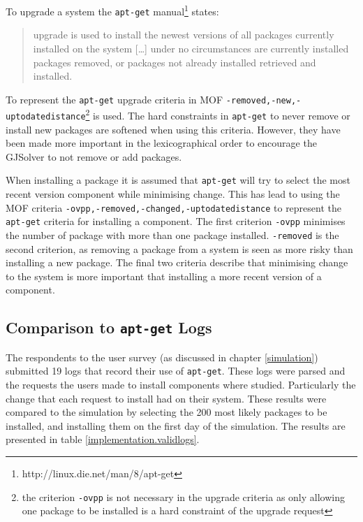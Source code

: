 To upgrade a system the \texttt{apt-get} manual\footnote{http://linux.die.net/man/8/apt-get} states:
\begin{quotation}
upgrade is used to install the newest versions of all packages currently installed on the system 
[\ldots] 
under no circumstances are currently installed packages removed, or packages not already installed retrieved and installed.
\end{quotation}
To represent the \texttt{apt-get} upgrade criteria in MOF 
\texttt{-removed,-new,-uptodatedistance}\footnote{the criterion \texttt{-ovpp} is not necessary in the upgrade criteria 
as only allowing one package to be installed is a hard constraint of the upgrade request} 
is used.
The hard constraints in \texttt{apt-get} to never remove or install new packages are softened when using this criteria.
However, they have been made more important in the lexicographical order to encourage the GJSolver to not remove or add packages.

When installing a package it is assumed that \texttt{apt-get} will try to select the most recent version component while minimising change.
This has lead to using the MOF criteria \texttt{-ovpp,-removed,-changed,-uptodatedistance} to represent the \texttt{apt-get} criteria for installing a component.
The first criterion \texttt{-ovpp} minimises the number of package with more than one package installed.
\texttt{-removed} is the second criterion, as removing a package from a system is seen as more risky than installing a new package.
The final two criteria describe that minimising change to the system is more important that installing a more recent version of a component.

\subsection{Comparison to \texttt{apt-get} Logs}
The respondents to the user survey (as discussed in chapter \ref{simulation}) submitted 19 logs that record their use of \texttt{apt-get}.
These logs were parsed and the requests the users made to install components where studied.
Particularly the change that each request to install had on their system.
These results were compared to the simulation by selecting the 200 most likely packages to be installed, and installing them on the first day of the simulation.
The results are presented in table \ref{implementation.validlogs}.

